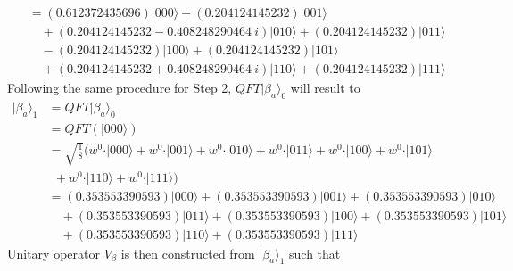 \begin{example}
\begin{align*}
		&= (0.612372435696) \vert 000 \rangle + (0.204124145232) \vert 001 \rangle \\
		& \quad + (0.204124145232 - 0.408248290464\ i) \vert 010 \rangle + (0.204124145232) \vert 011 \rangle \\
		& \quad - (0.204124145232) \vert 100 \rangle + (0.204124145232) \vert 101 \rangle  \\
		& \quad + (0.204124145232 + 0.408248290464\ i) \vert 110 \rangle + (0.204124145232) \vert 111 \rangle
	\end{align*}
	Following the same procedure for Step 2, $QFT\vert \beta_{a} \rangle_0$ will result to
	\begin{align*}
		\vert \beta_{a} \rangle_1 &= QFT\vert \beta_{a} \rangle_0 \\
		&= QFT\left( \vert 000  \rangle \right) \\
		&= \sqrt{\frac{1}{8}} \Big( w^{0} \cdot \vert 000 \rangle + w^{0} \cdot \vert 001 \rangle  + w^{0} \cdot \vert 010 \rangle + w^{0} \cdot \vert 011 \rangle + w^{0} \cdot \vert 100 \rangle + w^{0} \cdot \vert 101 \rangle \\
		&\ \ + w^{0} \cdot \vert 110 \rangle + w^{0} \cdot \vert 111 \rangle \Big) \\
		&= (0.353553390593) \vert 000 \rangle + (0.353553390593) \vert 001 \rangle + (0.353553390593) \vert 010 \rangle \\
		&\quad + (0.353553390593) \vert 011 \rangle + (0.353553390593) \vert 100 \rangle + (0.353553390593) \vert 101 \rangle \\
		&\quad + (0.353553390593) \vert 110 \rangle + (0.353553390593) \vert 111 \rangle
	\end{align*}
	Unitary operator $V_\beta$ is then constructed from $\vert \beta_{a} \rangle_1$ such that
	\begin{align*}

\end{align*}
\end{example}
